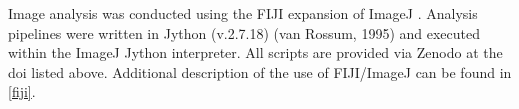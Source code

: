 Image analysis was conducted using the FIJI \citep{Schindelin2012, Rueden2017} expansion of ImageJ \citep{Schneider2012}. Analysis pipelines were written in Jython (v.2.7.18) (van Rossum, 1995) and executed within the ImageJ Jython interpreter. All scripts are provided via Zenodo at the doi listed above. Additional description of the use of FIJI/ImageJ can be found in \autoref{fiji}.




